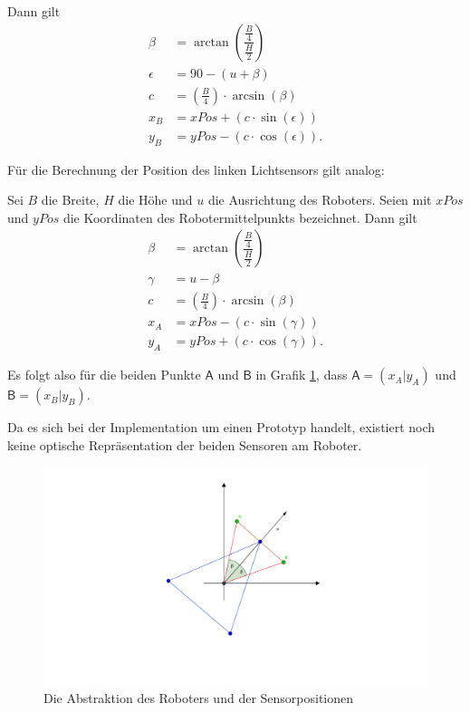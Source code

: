 \documentclass[paper=a4, DIV=calc, BCOR=12mm, twoside=on, onecolumn=on, open = right, titlepage =on, parskip =half-, headsepline = on, footsepline = off, chapterprefix = off, appendixprefix = on, fontsize = 12pt, numbers = noenddot, abstract = on]{scrbook}
\begin{document}
Dann gilt
\renewcommand\arraystretch{3}
\begin{align*}
\beta & = \arctan \left( \dfrac{\frac{B}{4}}{\frac{H}{2}} \right)\\
\epsilon & = 90 - (u + \beta)\\
c & = \left( \frac{B}{4} \right) \cdot \arcsin (\beta)\\
x_B & = xPos + \left( c \cdot \sin(\epsilon) \right)\\
y_B & = yPos - \left( c \cdot \cos(\epsilon) \right).
\end{align*}

Für die Berechnung der Position des linken Lichtsensors gilt analog:

Sei $B$ die Breite, $H$ die Höhe und $u$ die Ausrichtung des Roboters. Seien mit $xPos$ und $yPos$ die Koordinaten des Robotermittelpunkts bezeichnet. Dann gilt
\renewcommand\arraystretch{3}
\begin{align*}
\beta & = \arctan \left( \dfrac{\frac{B}{4}}{\frac{H}{2}} \right)\\
\gamma & = u - \beta\\
c & = \left( \frac{B}{4} \right) \cdot \arcsin (\beta)\\
x_A & = xPos - \left( c \cdot \sin(\gamma) \right)\\
y_A & = yPos + \left( c \cdot \cos(\gamma) \right).
\end{align*}

Es folgt also für die beiden Punkte $\mathsf{A}$ und $\mathsf{B}$ in Grafik \ref{fig:roboter_abstrakt}, dass $\mathsf{A} = \left( x_A \vert y_A \right)$ und $\mathsf{B} = \left( x_B \vert y_B \right)$.


Da es sich bei der Implementation um einen Prototyp handelt, existiert noch keine optische Repräsentation der beiden Sensoren am Roboter. 

\begin{figure}[htb]
\centering
\hspace*{-6em}\includegraphics[scale=1.1]{images/lichtsensorgrafik.png} 
\caption{Die Abstraktion des Roboters und der Sensorpositionen}
\label{fig:roboter_abstrakt}
\end{figure}
\end{document}
